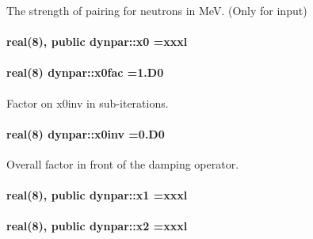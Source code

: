 The strength of pairing for neutrons in MeV. (Only for input) 

\paragraph[{\texorpdfstring{x0}{x0}}]{\setlength{\rightskip}{0pt plus 5cm}real(8), public dynpar\+::x0 =xxxl}\hypertarget{namespacedynpar_a7461eb81aceaa783be48352dd5139d52}{}\label{namespacedynpar_a7461eb81aceaa783be48352dd5139d52}
\paragraph[{\texorpdfstring{x0fac}{x0fac}}]{\setlength{\rightskip}{0pt plus 5cm}real(8) dynpar\+::x0fac =1.\+D0}\hypertarget{namespacedynpar_ade319b182a5cf3eeb532a266c036e1db}{}\label{namespacedynpar_ade319b182a5cf3eeb532a266c036e1db}


Factor on \textquotesingle{}x0inv\textquotesingle{} in sub-\/iterations. 

\paragraph[{\texorpdfstring{x0inv}{x0inv}}]{\setlength{\rightskip}{0pt plus 5cm}real(8) dynpar\+::x0inv =0.\+D0}\hypertarget{namespacedynpar_a57dd802430450aea66e77f67862b706d}{}\label{namespacedynpar_a57dd802430450aea66e77f67862b706d}


Overall factor in front of the damping operator. 

\paragraph[{\texorpdfstring{x1}{x1}}]{\setlength{\rightskip}{0pt plus 5cm}real(8), public dynpar\+::x1 =xxxl}\hypertarget{namespacedynpar_a1795899561c89510221eb9813958b454}{}\label{namespacedynpar_a1795899561c89510221eb9813958b454}
\paragraph[{\texorpdfstring{x2}{x2}}]{\setlength{\rightskip}{0pt plus 5cm}real(8), public dynpar\+::x2 =xxxl}\hypertarget{namespacedynpar_ab79dff0c71924920f22bdb65728854d1}{}\label{namespacedynpar_ab79dff0c71924920f22bdb65728854d1}
